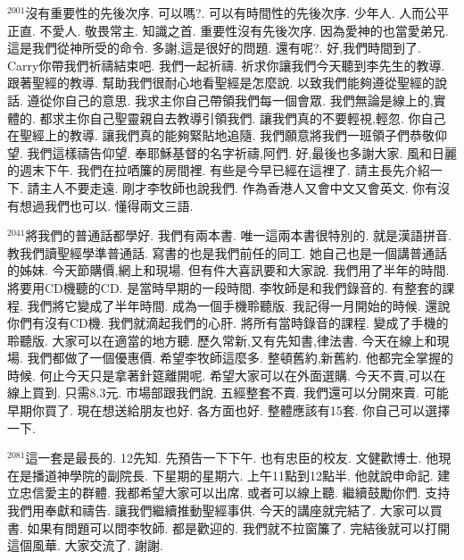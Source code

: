 \documentclass{book}
\begin{document}
$^{2001}$沒有重要性的先後次序.
可以嗎?.
可以有時間性的先後次序.
少年人.
人而公平正直.
不愛人.
敬畏常主.
知識之首.
重要性沒有先後次序.
因為愛神的也當愛弟兄.
這是我們從神所受的命令.
多謝,這是很好的問題.
還有呢?.
好,我們時間到了.
Carry你帶我們祈禱結束吧.
我們一起祈禱.
祈求你讓我們今天聽到李先生的教導.
跟著聖經的教導.
幫助我們很耐心地看聖經是怎麼說.
以致我們能夠遵從聖經的說話.
遵從你自己的意思.
我求主你自己帶領我們每一個會眾.
我們無論是線上的,實體的.
都求主你自己聖靈親自去教導引領我們.
讓我們真的不要輕視,輕忽.
你自己在聖經上的教導.
讓我們真的能夠緊貼地追隨.
我們願意將我們一班領子們恭敬仰望.
我們這樣禱告仰望.
奉耶穌基督的名字祈禱,阿們.
好,最後也多謝大家.
風和日麗的週末下午.
我們在拉哂簾的房間裡.
有些是今早已經在這裡了.
請主長先介紹一下.
請主人不要走遠.
剛才李牧師也說我們.
作為香港人又會中文又會英文.
你有沒有想過我們也可以.
懂得兩文三語.

$^{2041}$將我們的普通話都學好.
我們有兩本書.
唯一這兩本書很特別的.
就是漢語拼音.
教我們讀聖經學準普通話.
寫書的也是我們前任的同工.
她自己也是一個講普通話的姊妹.
今天節購價,網上和現場.
但有件大喜訊要和大家說.
我們用了半年的時間.
將要用CD機聽的CD.
是當時早期的一段時間.
李牧師是和我們錄音的.
有整套的課程.
我們將它變成了半年時間.
成為一個手機聆聽版.
我記得一月開始的時候.
還說你們有沒有CD機.
我們就滴起我們的心肝.
將所有當時錄音的課程.
變成了手機的聆聽版.
大家可以在適當的地方聽.
歷久常新,又有先知書,律法書.
今天在線上和現場.
我們都做了一個優惠價.
希望李牧師這麼多.
整頓舊約,新舊約.
他都完全掌握的時候.
何止今天只是拿著針筵離開呢.
希望大家可以在外面選購.
今天不賣,可以在線上買到.
只需8.3元.
市場部跟我們說.
五經整套不賣.
我們還可以分開來賣.
可能早期你買了.
現在想送給朋友也好.
各方面也好.
整體應該有15套.
你自己可以選擇一下.

$^{2081}$這一套是最長的.
12先知.
先預告一下下午.
也有忠臣的校友.
文健歡博士.
他現在是播道神學院的副院長.
下星期的星期六.
上午11點到12點半.
他就說申命記.
建立忠信愛主的群體.
我都希望大家可以出席.
或者可以線上聽.
繼續鼓勵你們.
支持我們用奉獻和禱告.
讓我們繼續推動聖經事供.
今天的講座就完結了.
大家可以買書.
如果有問題可以問李牧師.
都是歡迎的.
我們就不拉窗簾了.
完結後就可以打開這個風華.
大家交流了.
謝謝.
\newpage
\end{document}
